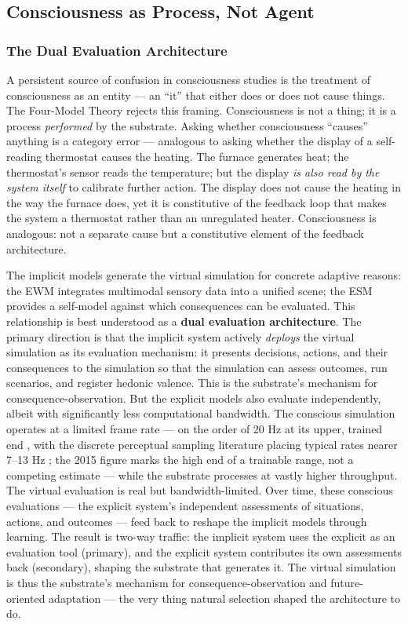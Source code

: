 \documentclass[12pt]{article}
\newcommand{\revstart}{}
\newcommand{\revend}{}
\begin{document}
\subsection{Consciousness as Process, Not Agent}



\subsubsection{The Dual Evaluation Architecture}


A persistent source of confusion in consciousness studies is the treatment of consciousness as an entity --- an ``it'' that either does or does not cause things. The Four-Model Theory rejects this framing. Consciousness is not a thing; it is a process \emph{performed} by the substrate. Asking whether consciousness ``causes'' anything is a category error --- {\revstart analogous to asking whether the display of a self-reading thermostat causes the heating. The furnace generates heat; the thermostat's sensor reads the temperature; but the display \emph{is also read by the system itself} to calibrate further action. The display does not cause the heating in the way the furnace does, yet it is constitutive of the feedback loop that makes the system a thermostat rather than an unregulated heater. Consciousness is analogous: not a separate cause but a constitutive element of the feedback architecture.\revend}

The implicit models generate the virtual simulation for concrete adaptive reasons: the EWM integrates multimodal sensory data into a unified scene; the ESM provides a self-model against which consequences can be evaluated. This relationship is best understood as a \textbf{dual evaluation architecture}. The primary direction is that the implicit system actively \emph{deploys} the virtual simulation as its evaluation mechanism: it presents decisions, actions, and their consequences to the simulation so that the simulation can assess outcomes, run scenarios, and register hedonic valence. This is the substrate's mechanism for consequence-observation. But the explicit models also evaluate independently, albeit with significantly less computational bandwidth. The conscious simulation operates at a limited frame rate --- on the order of 20 Hz at its upper, trained end \citep{Gruber2015}, with the discrete perceptual sampling literature placing typical rates nearer 7--13 Hz \citep{VanRullen2003}; the 2015 figure marks the high end of a trainable range, not a competing estimate --- while the substrate processes at vastly higher throughput. The virtual evaluation is real but bandwidth-limited. Over time, these conscious evaluations --- the explicit system's independent assessments of situations, actions, and outcomes --- feed back to reshape the implicit models through learning. The result is two-way traffic: the implicit system uses the explicit as an evaluation tool (primary), and the explicit system contributes its own assessments back (secondary), shaping the substrate that generates it. The virtual simulation is thus the substrate's mechanism for consequence-observation and future-oriented adaptation --- the very thing natural selection shaped the architecture to do.
\end{document}
